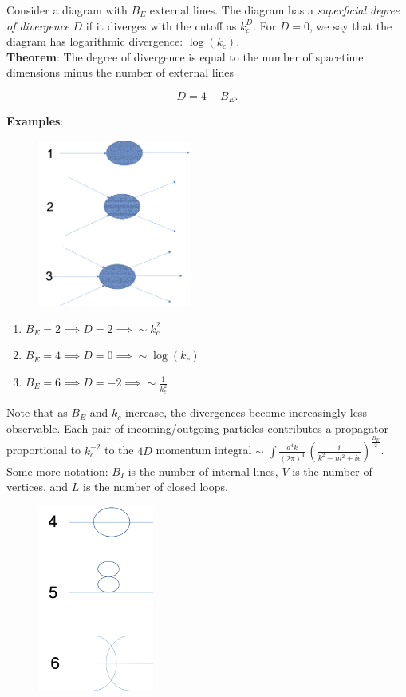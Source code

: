\noindent Consider a diagram with $B_E$ external lines. The diagram has a \textit{superficial degree of divergence} $D$ if it diverges with the cutoff as $k_c^D$. For $D=0$, we say that the diagram has logarithmic divergence: $\log{(k_c)}$. \\

\noindent \textbf{Theorem}: The degree of divergence is equal to the number of spacetime dimensions minus the number of external lines

\begin{equation}
D = 4 - B_E .
\end{equation}

\textbf{Examples}:

\begin{figure}[H]
	\centering
	\includegraphics[width=2in]{images/dod_ex1.png}
\end{figure}

\begin{enumerate}
\item $B_E = 2 \implies D = 2 \implies \sim k_c^2$
\item $B_E = 4 \implies D = 0 \implies \sim \log{(k_c)}$
\item $B_E = 6 \implies D = -2 \implies \sim \frac{1}{k_c^2}$
\end{enumerate}

\noindent Note that as $B_E$ and $k_c$ increase, the divergences become increasingly less observable. Each pair of incoming/outgoing particles contributes a propagator proportional to $k_c^{-2}$ to the $4D$ momentum integral $\sim \,\, \int \frac{d^4 k}{(2 \pi)^4} \, \left(\frac{i}{k^2 - m^2 + i \epsilon}\right)^{\frac{B_E}{2}}$.  \\

\noindent Some more notation: $B_I$ is the number of internal lines, $V$ is the number of vertices, and $L$ is the number of closed loops. \\

\begin{figure}[H]
	\centering
	\includegraphics[width=1.5in]{images/dod_ex2.png}
\end{figure}

